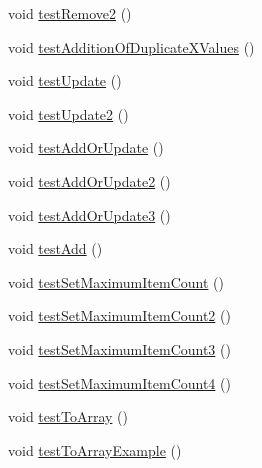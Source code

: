 \begin{DoxyCompactItemize}
\item 
void \mbox{\hyperlink{classorg_1_1jfree_1_1data_1_1xy_1_1_x_y_series_test_a71af63f27f330d69298d0be67c29d367}{test\+Remove2}} ()
\item 
void \mbox{\hyperlink{classorg_1_1jfree_1_1data_1_1xy_1_1_x_y_series_test_aae43b8d593077b58d5e5a00c20b537c8}{test\+Addition\+Of\+Duplicate\+X\+Values}} ()
\item 
void \mbox{\hyperlink{classorg_1_1jfree_1_1data_1_1xy_1_1_x_y_series_test_aca79255733e1b54ef62c3da7026e0a5a}{test\+Update}} ()
\item 
void \mbox{\hyperlink{classorg_1_1jfree_1_1data_1_1xy_1_1_x_y_series_test_aafa45e7aff01f10594fa372c187f55de}{test\+Update2}} ()
\item 
void \mbox{\hyperlink{classorg_1_1jfree_1_1data_1_1xy_1_1_x_y_series_test_a3347321dc3c7f67c16dbdc75658c5ebc}{test\+Add\+Or\+Update}} ()
\item 
void \mbox{\hyperlink{classorg_1_1jfree_1_1data_1_1xy_1_1_x_y_series_test_aea1be9e6e8ee5747e4f01de7909c69bc}{test\+Add\+Or\+Update2}} ()
\item 
void \mbox{\hyperlink{classorg_1_1jfree_1_1data_1_1xy_1_1_x_y_series_test_a7330020ed7867af2d5759f8f3a209397}{test\+Add\+Or\+Update3}} ()
\item 
void \mbox{\hyperlink{classorg_1_1jfree_1_1data_1_1xy_1_1_x_y_series_test_a4e7d88f64b68f8e478003bde66a56dd7}{test\+Add}} ()
\item 
void \mbox{\hyperlink{classorg_1_1jfree_1_1data_1_1xy_1_1_x_y_series_test_a08161f7ceb6ad333d4504c5e42c58c9e}{test\+Set\+Maximum\+Item\+Count}} ()
\item 
void \mbox{\hyperlink{classorg_1_1jfree_1_1data_1_1xy_1_1_x_y_series_test_a6a29af6d692969475d5307fd4000bd3f}{test\+Set\+Maximum\+Item\+Count2}} ()
\item 
void \mbox{\hyperlink{classorg_1_1jfree_1_1data_1_1xy_1_1_x_y_series_test_a81660a9541aa9cd25fbc32d77dd734ca}{test\+Set\+Maximum\+Item\+Count3}} ()
\item 
void \mbox{\hyperlink{classorg_1_1jfree_1_1data_1_1xy_1_1_x_y_series_test_a2f85c54c4c124c0606ac4476f22cfab4}{test\+Set\+Maximum\+Item\+Count4}} ()
\item 
void \mbox{\hyperlink{classorg_1_1jfree_1_1data_1_1xy_1_1_x_y_series_test_a284bc50ee51f24f9a07c2918c4be131c}{test\+To\+Array}} ()
\item 
void \mbox{\hyperlink{classorg_1_1jfree_1_1data_1_1xy_1_1_x_y_series_test_a20a86f0f1149501396ee5afeb321ac59}{test\+To\+Array\+Example}} ()
\item 

\end{DoxyCompactItemize}
